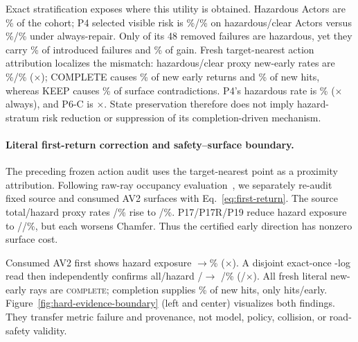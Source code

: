 Exact stratification exposes where this utility is obtained. Hazardous Actors are \PfourteenHazardActorShare{}\% of the cohort;
P4 selected visible risk is \PfourteenPfourHazardRisk{}\%/\PfourteenPfourClearRisk{}\% on hazardous/clear Actors versus
\PfourteenAlwaysHazardRisk{}\%/\PfourteenAlwaysClearRisk{}\% under always-repair. Only
\PfourteenPfourHazardFailureReduction{} of its 48 removed failures are hazardous, yet they carry
\PfourteenPfourHazardFailureShare{}\% of introduced failures and \PfourteenPfourHazardGainShare{}\% of gain. Fresh
target-nearest action attribution localizes the mismatch: hazardous/clear proxy new-early rates are
\PfifteenHazardNewEarlyRate{}\%/\PfifteenClearNewEarlyRate{}\% (\PfifteenHazardClearRatio{}$\times$); COMPLETE causes
\PfifteenCompleteNewEarlyShare{}\% of new early returns and \PfifteenCompleteNewHitShare{}\% of new hits, whereas KEEP causes
\PfifteenKeepContradictionShare{}\% of surface contradictions. P4's hazardous rate is \PfifteenPfourHazardNewEarlyRate{}\%
(\PfifteenPfourHazardVsAlways{}$\times$ always), and P6-C is \PfifteenPsixHazardVsAlways{}$\times$. State preservation
therefore does not imply hazard-stratum risk reduction or suppression of its completion-driven mechanism.

\paragraph{Literal first-return correction and safety--surface boundary.}
The preceding frozen action audit uses the target-nearest point as a proximity attribution. Following raw-ray occupancy
evaluation~\cite{kalble2024accurate}, we separately re-audit fixed source and consumed AV2 surfaces with Eq.~\ref{eq:first-return}. The
source total/hazard proxy rates \PtwentyLegacyTotalEarly{}/\PtwentyLegacyHazardEarly{}\% rise to
\PtwentyTrueTotalEarly{}/\PtwentyTrueHazardEarly{}\%. P17/P17R/P19 reduce hazard exposure to
\PtwentyPseventeenHazardEarly{}/\PtwentyPseventeenRHazardEarly{}/\PtwentyPnineteenHazardEarly{}\%, but each worsens Chamfer.
Thus the certified early direction has nonzero surface cost.

Consumed AV2 first shows hazard exposure \PtwentytwoProxyHazardEarly{}$\rightarrow$\PtwentytwoTrueHazardEarly{}\%
(\PtwentytwoHazardRatio{}$\times$). A disjoint exact-once \PtwentythreeLogs{}-log read then independently confirms all/hazard
\PtwentythreeProxyTotalEarly{}/\PtwentythreeProxyHazardEarly{}$\rightarrow$
\PtwentythreeTrueTotalEarly{}/\PtwentythreeTrueHazardEarly{}\% (\PtwentythreeTotalRatio{}/\PtwentythreeHazardRatio{}$\times$).
All \PtwentythreeTrueNewEarly{} fresh literal new-early rays are \textsc{complete}; completion supplies
\PtwentythreeCompleteNewHitShare{}\% of \PtwentythreeTrueNewHits{} new hits, only \PtwentythreeHitEarlyRatio{} hits/early.
Figure~\ref{fig:hard-evidence-boundary} (left and center) visualizes both findings. They transfer metric failure and provenance,
not model, policy, collision, or road-safety validity.

